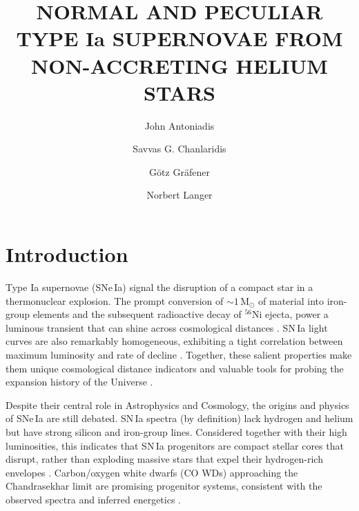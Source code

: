 \documentclass[twocolumn,tighten,times]{aastex62}
\begin{document}
\title{NORMAL AND PECULIAR TYPE Ia SUPERNOVAE FROM NON-ACCRETING HELIUM STARS}



\author[0000-0002-0786-7307]{John Antoniadis}


\author{Savvas G. Chanlaridis}
\author{G\"{o}tz Gr\"{a}fener}
\author{Norbert Langer}

\begin{abstract}
  
\end{abstract}



\section{Introduction} \label{sec:intro}
Type Ia supernovae (SNe\,Ia) signal the  disruption of a compact star 
in a thermonuclear explosion. The prompt conversion of $\sim 1$\,M$_{\odot}$ of  
material into iron-group elements and the subsequent radioactive decay of $^{56}$Ni
ejecta, power a luminous transient that can shine across 
cosmological distances \citep[e.g.][]{arn82}. SN\,Ia light curves are 
also remarkably homogeneous, exhibiting a tight correlation between maximum luminosity and 
rate of decline \citep{phi93}. Together, these  salient properties make them 
unique cosmological distance indicators and valuable tools for probing the expansion 
history of the Universe \citep{rfc+98,pag99}. 

 Despite their central role in Astrophysics and Cosmology, 
 the origins and physics of SNe\,Ia are still debated. 
 SN\,Ia spectra (by definition) lack hydrogen and helium but have strong silicon and iron-group lines. 
 Considered together with their high luminosities, this indicates  that SN\,Ia progenitors are 
 compact stellar cores that disrupt, rather than exploding 
 massive stars that expel their hydrogen-rich envelopes
 \citep[][and references therein]{mmn14}. 
 Carbon/oxygen white dwarfs (CO WDs) approaching the Chandrasekhar limit 
 are promising progenitor systems, consistent with the observed 
 spectra and inferred energetics \citep{arn69,wz12,mmn14}.
 
\end{document}
